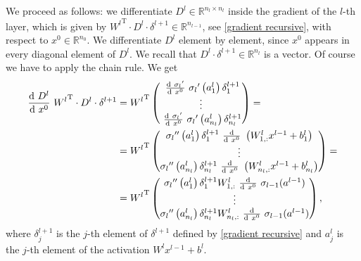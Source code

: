 We proceed as follows: we differentiate $D^{l} \in \mathbb{R}^{n_l \times n_l}$ inside the gradient of the $l$-th layer, which is given by ${W^{l}}^{\mathrm{T}} \cdot D^{l} \cdot \delta^{l+1} \in \mathbb{R}^{n_{l-1}}$, see \cref{gradient recursive}, with respect to $x^0 \in \mathbb{R}^{n_0}$. We differentiate $D^l$ element by element, since $x^0$ appears in every diagonal element of $D^{l}$. We recall that $D^{l} \cdot \delta^{l+1} \in \mathbb{R}^{n_l}$ is a vector. Of course we have to apply the chain rule. We get
\begin{equation} 
    \label{pervert differential}
    \begin{aligned}
        \frac{\textup{d} \ D^{l}}{\textup{d} \ x^0} \  {W^{l}}^{\mathrm{T}} \cdot D^{l} \cdot \delta^{l+1} & = {W^{l}}^{\mathrm{T}} \begin{pmatrix}\ \frac{\textup{d} \ {\sigma_{l}}^{\prime}}{\textup{d} \ x^0} \  {\sigma_{l}}^{\prime} \left( a^{l}_1 \right) \delta^{l+1}_1 \\ \vdots \\ \ \frac{\textup{d} \ {\sigma_{l}}^{\prime}}{\textup{d} \ x^0} \  {\sigma_{l}}^{\prime} \left( a^{l}_{n_l} \right) \delta^{l+1}_{n_l} \end{pmatrix} = \\
        & = {W^{l}}^{\mathrm{T}} \begin{pmatrix} {\sigma_{l}}^{\prime \prime} \left( a^{l}_1 \right) \delta^{l+1}_1\ \frac{\textup{d}}{\textup{d} \ x^0} \  \left( W^{l}_{1,:} x^{l-1} + b^l_{1} \right) \\ \vdots \\ {\sigma_{l}}^{\prime \prime} \left( a^{l}_{n_l} \right) \delta^{l+1}_{n_l} \ \frac{\textup{d}}{\textup{d} \ x^0} \  \left( W^{l}_{n_l,:} x^{l-1} + b^l_{n_l} \right) \end{pmatrix} = \\
        & = {W^{l}}^{\mathrm{T}} \begin{pmatrix} {\sigma_{l}}^{\prime \prime} \left( a^{l}_1 \right) \delta^{l+1}_1 W^{l}_{1,:} \ \frac{\textup{d}}{\textup{d} \ x^0} \  \sigma_{l-1}(a^{l-1})\\ \vdots \\ {\sigma_{l}}^{\prime \prime} \left( a^{l}_{n_l} \right) \delta^{l+1}_{n_l}  W^{l}_{n_l,:} \ \frac{\textup{d}}{\textup{d} \ x^0} \  \sigma_{l-1}(a^{l-1}) \end{pmatrix},
    \end{aligned} 
\end{equation}
where $\delta^{l+1}_j$ is the $j$-th element of $\delta^{l+1}$ defined by \cref{gradient recursive} and $a^{l}_j$ is the $j$-th element of the activation $W^l x^{l-1} + b^l$. \\
